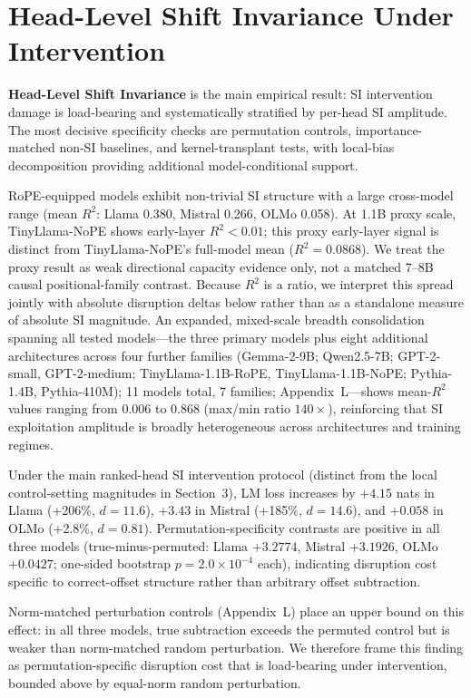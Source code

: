 \documentclass{article}
\begin{document}
\section{Head-Level Shift Invariance Under Intervention}
\label{sec:headlevel}

\textbf{Head-Level Shift Invariance} is the main empirical result: SI intervention damage is load-bearing and systematically stratified by per-head SI amplitude. The most decisive specificity checks are permutation controls, importance-matched non-SI baselines, and kernel-transplant tests, with local-bias decomposition providing additional model-conditional support.

RoPE-equipped models exhibit non-trivial SI structure with a large cross-model range (mean $R^2$: Llama 0.380, Mistral 0.266, OLMo 0.058). At 1.1B proxy scale, TinyLlama-NoPE shows early-layer $R^2<0.01$; this proxy early-layer signal is distinct from TinyLlama-NoPE's full-model mean ($R^2{=}0.0868$). We treat the proxy result as weak directional capacity evidence only, not a matched 7--8B causal positional-family contrast. Because $R^2$ is a ratio, we interpret this spread jointly with absolute disruption deltas below rather than as a standalone measure of absolute SI magnitude. An expanded, mixed-scale breadth consolidation spanning all tested models---the three primary models plus eight additional architectures across four further families (Gemma-2-9B; Qwen2.5-7B; GPT-2-small, GPT-2-medium; TinyLlama-1.1B-RoPE, TinyLlama-1.1B-NoPE; Pythia-1.4B, Pythia-410M); 11 models total, 7 families; Appendix~L---shows mean-$R^2$ values ranging from 0.006 to 0.868 (max/min ratio $140\times$), reinforcing that SI exploitation amplitude is broadly heterogeneous across architectures and training regimes.

Under the main ranked-head SI intervention protocol (distinct from the local control-setting magnitudes in Section~3), LM loss increases by $+4.15$ nats in Llama (+206\%, $d=11.6$), $+3.43$ in Mistral (+185\%, $d=14.6$), and $+0.058$ in OLMo (+2.8\%, $d=0.81$). Permutation-specificity contrasts are positive in all three models (true-minus-permuted: Llama $+3.2774$, Mistral $+3.1926$, OLMo $+0.0427$; one-sided bootstrap $p=2.0\times10^{-4}$ each), indicating disruption cost specific to correct-offset structure rather than arbitrary offset subtraction.

Norm-matched perturbation controls (Appendix~L) place an upper bound on this effect: in all three models, true subtraction exceeds the permuted control but is weaker than norm-matched random perturbation. We therefore frame this finding as permutation-specific disruption cost that is load-bearing under intervention, bounded above by equal-norm random perturbation.
\end{document}
